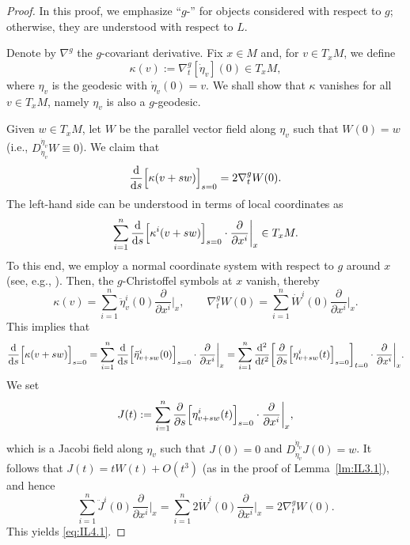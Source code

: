 \documentclass[a4paper,11pt]{article}
\numberwithin{equation}{section}
\theoremstyle{definition}
\theoremstyle{plain}
\newcommand{\del}{\partial}
\newcommand{\dd}{\mathrm{d}}
\begin{document}
\begin{proof}
In this proof, we emphasize ``$g$-'' for objects considered with respect to $g$; otherwise, they are understood with respect to $L$. 

Denote by $\nabla^g$ the $g$-covariant derivative.
Fix $x \in M$ and, for $v \in T_xM$, we define
\[ \kappa(v) :=\nabla^g_t [\dot{\eta}_v](0) \in T_xM, \]
where $\eta_v$ is the geodesic with $\dot{\eta}_v(0)=v$.
We shall show that $\kappa$ vanishes for all $v \in T_xM$, namely $\eta_v$ is also a $g$-geodesic.

Given $w \in T_xM$, let $W$ be the parallel vector field along $\eta_v$ such that $W(0)=w$
(i.e., $D_{\dot{\eta}_v}^{\dot{\eta}_v} W \equiv 0$).
We claim that
\begin{equation}\label{eq:IL4.1}
\frac{\dd}{\dd s} \Bigl[ \kappa(v+sw) \Bigr]_{s=0} =2 \nabla^g_t W(0). 
\end{equation}
The left-hand side can be understood in terms of local coordinates as
\[ \sum_{i=1}^n \frac{\dd}{\dd s} \Bigl[ \kappa^i(v+sw) \Bigr]_{s=0} \cdot \frac{\del}{\del x^i}\bigg|_x \in T_xM. \]
To this end, we employ a normal coordinate system with respect to $g$ around $x$
(see, e.g., \cite[Proposition~3.33]{ON}).
Then, the $g$-Christoffel symbols at $x$ vanish, thereby
\[ \kappa(v) =\sum_{i=1}^n \ddot{\eta}_v^i(0) \frac{\del}{\del x^i}\bigg|_x, \qquad
 \nabla^g_t W(0) =\sum_{i=1}^n \dot{W}^i(0) \frac{\del}{\del x^i}\bigg|_x. \]
This implies that
\[ \frac{\dd}{\dd s} \Bigl[ \kappa(v+sw) \Bigr]_{s=0}
 =\sum_{i=1}^n \frac{\dd}{\dd s} \Bigl[ \ddot{\eta}^i_{v+sw}(0) \Bigr]_{s=0} \cdot \frac{\del}{\del x^i}\bigg|_x
 =\sum_{i=1}^n \frac{\dd^2}{\dd t^2} \biggl[ \frac{\partial}{\partial s} \Bigl[ \eta^i_{v+sw}(t) \Bigr]_{s=0} \biggr]_{t=0} \cdot \frac{\del}{\del x^i}\bigg|_x. \]
We set
\[ J(t) :=\sum_{i=1}^n \frac{\partial}{\partial s} \Bigl[ \eta^i_{v+sw}(t) \Bigr]_{s=0} \cdot \frac{\del}{\del x^i}\bigg|_x, \]
which is a Jacobi field along $\eta_v$ such that $J(0)=0$ and $D^{\dot{\eta}_v}_{\dot{\eta}_v} J(0)=w$.
It follows that $J(t)=tW(t)+O(t^3)$ (as in the proof of Lemma~\ref{lm:IL3.1}), and hence
\[ \sum_{i=1}^n \ddot{J}^i(0) \frac{\del}{\del x^i}\bigg|_x
 =\sum_{i=1}^n 2\dot{W}^i(0) \frac{\del}{\del x^i}\bigg|_x
 =2\nabla^g_t W(0). \]
This yields \eqref{eq:IL4.1}.


\end{proof}
\end{document}
